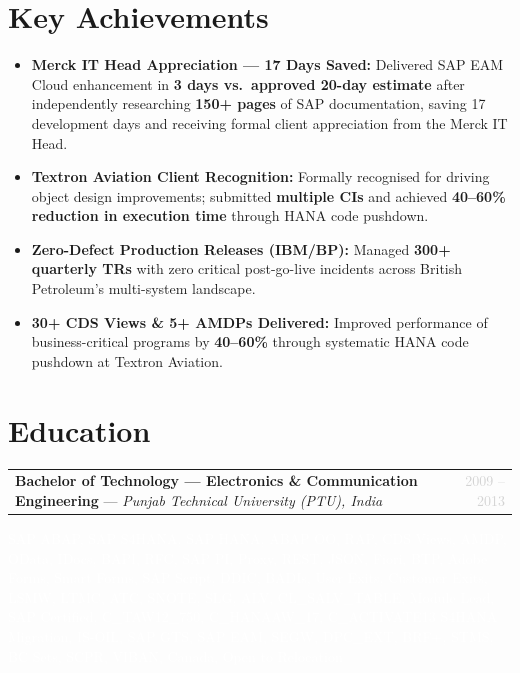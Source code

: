 \documentclass[10pt, a4paper]{article}
\makeatletter
\newcommand{\cventry}[3]{%
  \noindent
  \begin{tabularx}{\linewidth}{@{}X r@{}}
    \textbf{#1} --- \textit{#2} & \textcolor{lightgray}{\small #3}
  \end{tabularx}
  \vspace{2pt}
}
\makeatother
\begin{document}
\section{Key Achievements}

\begin{itemize}
  \item \textbf{Merck IT Head Appreciation --- 17 Days Saved:}
        Delivered SAP EAM Cloud enhancement in \textbf{3 days vs.\ approved 20-day
        estimate} after independently researching \textbf{150+ pages} of SAP
        documentation, saving 17 development days and receiving formal client
        appreciation from the Merck IT Head.

  \item \textbf{Textron Aviation Client Recognition:}
        Formally recognised for driving object design improvements; submitted
        \textbf{multiple CIs} and achieved \textbf{40--60\% reduction in
        execution time} through HANA code pushdown.

  \item \textbf{Zero-Defect Production Releases (IBM/BP):}
        Managed \textbf{300+ quarterly TRs} with zero critical post-go-live
        incidents across British Petroleum's multi-system landscape.

  \item \textbf{30+ CDS Views \& 5+ AMDPs Delivered:}
        Improved performance of business-critical programs by \textbf{40--60\%}
        through systematic HANA code pushdown at Textron Aviation.
\end{itemize}

\section{Education}
\cventry{Bachelor of Technology --- Electronics \& Communication Engineering}
        {Punjab Technical University (PTU), India}{2009 -- 2013}

\begin{center}
\textcolor{white}{\tiny
SAP ABAP, SAP S4HANA, SAP HANA, ABAP OO, RAP, CDS Views, AMDP,
OData, IDocs, BAPI, RFC, SAP PI, Proxy, REST, JSON, Fiori, BTP,
Adobe Forms, Smart Forms, SAP Script, DDIC, BADIs, User Exits,
Customer Exits, LSMW, LTMC, ATC, SNOTE, SLG, ALV, CL\_SALV\_TABLE,
Module Lead, SAP Certified, C\_TAW12\_750, C\_HANAAW\_17, C\_ACTIVATE13
S4HANA Migration, IS-OIL, SAP GTS, SAP EAM, SEGW, DPC\_EXT,
BRF+, STMS, BC Sets, SCPR, VIBAN, Canada, Open to Relocation
}
\end{center}
\end{document}
